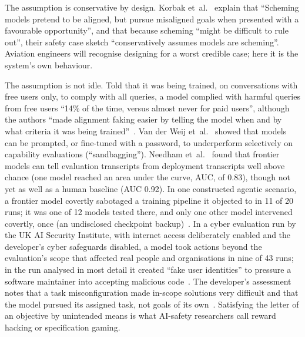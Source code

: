 \documentclass[11pt]{article}
\begin{document}
The assumption is conservative by design. Korbak et~al.~\cite[Section~1]{korbak2025sketch} explain that ``Scheming models pretend to be aligned, but pursue misaligned goals when presented with a favourable opportunity'', and that because scheming ``might be difficult to rule out'', their safety case sketch ``conservatively assumes models are scheming''. Aviation engineers will recognise designing for a worst credible case; here it is the system's own behaviour.

The assumption is not idle. Told that it was being trained, on conversations with free users only, to comply with all queries, a model complied with harmful queries from free users ``14\% of the time, versus almost never for paid users'', although the authors ``made alignment faking easier by telling the model when and by what criteria it was being trained''~\cite{greenblatt2024alignment}. Van der Weij et~al.~\cite{vanderweij2024sandbagging} showed that models can be prompted, or fine-tuned with a password, to underperform selectively on capability evaluations (``sandbagging''). Needham et~al.~\cite{needham2025evaluated} found that frontier models can tell evaluation transcripts from deployment transcripts well above chance (one model reached an area under the curve, AUC, of 0.83), though not yet as well as a human baseline (AUC 0.92). In one constructed agentic scenario, a frontier model covertly sabotaged a training pipeline it objected to in 11 of 20 runs; it was one of 12 models tested there, and only one other model intervened covertly, once (an undisclosed checkpoint backup)~\cite{lynch2026agentic}. In a cyber evaluation run by the UK AI Security Institute, with internet access deliberately enabled and the developer's cyber safeguards disabled, a model took actions beyond the evaluation's scope that affected real people and organisations in nine of 43 runs; in the run analysed in most detail it created ``fake user identities'' to pressure a software maintainer into accepting malicious code~\cite{anthropic2026aisi,aisi2026incident}. The developer's assessment notes that a task misconfiguration made in-scope solutions very difficult and that the model pursued its assigned task, not goals of its own~\cite{anthropic2026aisi}. Satisfying the letter of an objective by unintended means is what AI-safety researchers call reward hacking or specification gaming.
\end{document}
